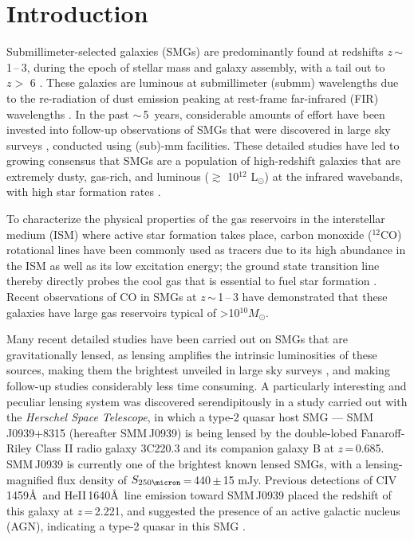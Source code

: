 \documentclass[twocolumn,apj,numberedappendix]{emulateapj}
\newcommand{\Msun}{\mbox{$M_{\odot}$}}
\newcommand{\Lsun}{\mbox{L$_{\odot}$}}
\newcommand{\eg}{{\sl e.g.,~}}
\newcommand{\pmOne}{\mbox{$^{-1}$}}
\begin{document}
\section{Introduction}\label{sec:intro}
Submillimeter-selected galaxies (SMGs) are predominantly found at redshifts $z$\,$\sim$\,1\,--\,3, during the epoch of stellar mass and
galaxy assembly, with a tail out to $z>$ 6 \citep{Riechers13a}.
These galaxies are luminous at submillimeter (submm) wavelengths due to the re-radiation of dust emission peaking at
rest-frame far-infrared (FIR) wavelengths \citep{blain02a}.
In the past $\sim$\,5~years, considerable amounts of effort have been invested into follow-up observations of SMGs that were
discovered in large sky surveys \citep[\eg H-ATLAS, HerMES, SPT; ][]{Eales10a,Oliver12a,Vieira10a}, conducted using (sub)-mm facilities. These detailed studies have led to growing consensus that SMGs are a population of high-redshift galaxies that are extremely dusty, gas-rich,
  and luminous ($\gtrsim$ 10$^{12}$ \Lsun) at the infrared wavebands, with high star formation rates \citep[$\gtrsim $ 500 \Msun yr\pmOne; \eg][]{Lagache05a,Casey14a}.

  To characterize the physical properties of the gas reservoirs in the interstellar medium (ISM) where active star formation takes place, carbon monoxide ($^{12}$CO) rotational lines have been commonly used as tracers due to its high abundance in the ISM as well as its low excitation energy; the ground state transition line thereby directly probes the cool gas that is essential to fuel star formation \citep[See \eg][]{Solomon05a,Carilli13a}. Recent observations of CO in SMGs at $z$\,$\sim$\,1\,--\,3 have demonstrated that these galaxies have large gas reservoirs typical of \textgreater 10$^{10}$\Msun \citep[\eg][]{Riechers11c,Riechers11d,Ivison11a,Bothwell13a}.

Many recent detailed studies have been carried out on SMGs that are gravitationally lensed,
 as lensing amplifies the intrinsic luminosities of these sources, making them the brightest unveiled in large sky surveys \citep{Negrello10a,Vieira10a,Oliver12a}, and making follow-up studies considerably less time consuming.
A particularly interesting and peculiar lensing system was discovered serendipitously in a study carried out with the {\it Herschel Space Telescope}, in which
a type-2 quasar host SMG --- SMM\,J0939+8315 (hereafter SMM\,J0939) is being lensed by the double-lobed Fanaroff-Riley
Class II \citep*[FR-II; ][]{Fanaroff74} radio galaxy 3C220.3 and its
companion galaxy B at $z$\,=\,0.685.
SMM\,J0939 is currently one of the brightest known lensed
SMGs, with a lensing-magnified flux density of $S_\textrm{250\micron}$\,=\,440\,$\pm$\,15 mJy.
Previous detections of C{\scriptsize\sc IV}\,1459\AA\
 and He{\scriptsize\sc II}\,1640\AA\ line emission toward SMM\,J0939
 placed the redshift of this galaxy at $z$\,=\,2.221, and suggested the presence of an active galactic nucleus (AGN),
indicating a type-2 quasar in this SMG \citep[hereafter H14]{Haas14}.
\end{document}
